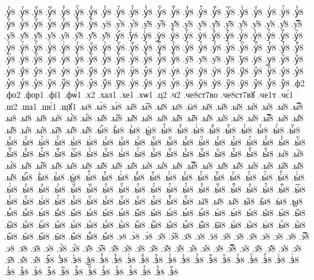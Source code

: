 {.у҅ⷰ8
.у҅ⷱ8
.у҅ⷲ8
.у҅ⷳ8
.у҅ⷴ8
.у҅ⷵ8
.у҅ⷶ8
.у҅ⷷ8
.у҅ⷸ8
.у҅ⷹ8
.у҅ⷺ8
.у҅ⷻ8
.у҅ⷼ8
.у҅ⷽ8
.у҅ⷾ8
.у҅ⷿ8
.у҅꙯8
.у҅ꙴ8
.у҅ꙵ8
.у҅ꙶ8
.у҅ꙷ8
.у҅ꙸ8
.у҅ꙹ8
.у҅ꙺ8
.у҅ꙻ8
.у҅꙼8
.у҅꙽8
.у҅ꚞ8
.у҅ꚟ8
.у҆8
.у҆̀8
.у҆́8
.у҆̂8
.у҆̅8
.у҆̆8
.у҆̇8
.у҆̈8
.у҆̋8
.у҆̏8
.у҆̑8
.у҆̓8
.у҆̔8
.у҆̾8
.у҆̿8
.у҆͘8
.у҆҃8
.у҆҄8
.у҆҅8
.у҆҆8
.у҆҇8
.у҆᷀8
.у҆᷁8
.у҆᷶8
.у᷷҆8
.у᷸҆8
.у᷹҆8
.у҆ⷠ8
.у҆ⷡ8
.у҆ⷢ8
.у҆ⷣ8
.у҆ⷤ8
.у҆ⷥ8
.у҆ⷦ8
.у҆ⷧ8
.у҆ⷨ8
.у҆ⷩ8
.у҆ⷪ8
.у҆ⷫ8
.у҆ⷬ8
.у҆ⷭ8
.у҆ⷮ8
.у҆ⷯ8
.у҆ⷰ8
.у҆ⷱ8
.у҆ⷲ8
.у҆ⷳ8
.у҆ⷴ8
.у҆ⷵ8
.у҆ⷶ8
.у҆ⷷ8
.у҆ⷸ8
.у҆ⷹ8
.у҆ⷺ8
.у҆ⷻ8
.у҆ⷼ8
.у҆ⷽ8
.у҆ⷾ8
.у҆ⷿ8
.у҆꙯8
.у҆ꙴ8
.у҆ꙵ8
.у҆ꙶ8
.у҆ꙷ8
.у҆ꙸ8
.у҆ꙹ8
.у҆ꙺ8
.у҆ꙻ8
.у҆꙼8
.у҆꙽8
.у҆ꚞ8
.у҆ꚟ8
.у҇8
.у᷀8
.у᷁8
.у᷶8
.у᷷8
.у᷸8
.у᷹8
.уⷠ8
.уⷡ8
.уⷢ8
.уⷣ8
.уⷤ8
.уⷥ8
.уⷦ8
.уⷧ8
.уⷨ8
.уⷩ8
.уⷪ8
.уⷫ8
.уⷬ8
.уⷭ8
.уⷮ8
.уⷯ8
.уⷰ8
.уⷱ8
.уⷲ8
.уⷳ8
.уⷴ8
.уⷵ8
.уⷶ8
.уⷷ8
.уⷸ8
.уⷹ8
.уⷺ8
.уⷻ8
.уⷼ8
.уⷽ8
.уⷾ8
.уⷿ8
.у꙯8
.уꙴ8
.уꙵ8
.уꙶ8
.уꙷ8
.уꙸ8
.уꙹ8
.уꙺ8
.уꙻ8
.у꙼8
.у꙽8
.уꚞ8
.уꚟ8
.ф2
.фо2
.фор1
.фї1
.фѡ́1
.х2
.хал1
.хе1
.хѡ1
.ц2
.ч2
.че8ст7во
.че8ст7вꙋ
.че1т
.чє́1
.ш2
.ша1
.шє́1
.щꙋ1
.ы8
.ы̀8
.ы́8
.ы̂8
.ы̅8
.ы̆8
.ы̇8
.ӹ8
.ы̋8
.ы̏8
.ы̑8
.ы̓8
.ы̔8
.ы̾8
.ы̿8
.ы͘8
.ы҃8
.ы҄8
.ы҅8
.ы҅̀8
.ы҅́8
.ы҅̂8
.ы҅̅8
.ы҅̆8
.ы҅̇8
.ы҅̈8
.ы҅̋8
.ы҅̏8
.ы҅̑8
.ы҅̓8
.ы҅̔8
.ы҅̾8
.ы҅̿8
.ы҅͘8
.ы҅҃8
.ы҅҄8
.ы҅҅8
.ы҅҆8
.ы҅҇8
.ы҅᷀8
.ы҅᷁8
.ы҅᷶8
.ы᷷҅8
.ы᷸҅8
.ы᷹҅8
.ы҅ⷠ8
.ы҅ⷡ8
.ы҅ⷢ8
.ы҅ⷣ8
.ы҅ⷤ8
.ы҅ⷥ8
.ы҅ⷦ8
.ы҅ⷧ8
.ы҅ⷨ8
.ы҅ⷩ8
.ы҅ⷪ8
.ы҅ⷫ8
.ы҅ⷬ8
.ы҅ⷭ8
.ы҅ⷮ8
.ы҅ⷯ8
.ы҅ⷰ8
.ы҅ⷱ8
.ы҅ⷲ8
.ы҅ⷳ8
.ы҅ⷴ8
.ы҅ⷵ8
.ы҅ⷶ8
.ы҅ⷷ8
.ы҅ⷸ8
.ы҅ⷹ8
.ы҅ⷺ8
.ы҅ⷻ8
.ы҅ⷼ8
.ы҅ⷽ8
.ы҅ⷾ8
.ы҅ⷿ8
.ы҅꙯8
.ы҅ꙴ8
.ы҅ꙵ8
.ы҅ꙶ8
.ы҅ꙷ8
.ы҅ꙸ8
.ы҅ꙹ8
.ы҅ꙺ8
.ы҅ꙻ8
.ы҅꙼8
.ы҅꙽8
.ы҅ꚞ8
.ы҅ꚟ8
.ы҆8
.ы҆̀8
.ы҆́8
.ы҆̂8
.ы҆̅8
.ы҆̆8
.ы҆̇8
.ы҆̈8
.ы҆̋8
.ы҆̏8
.ы҆̑8
.ы҆̓8
.ы҆̔8
.ы҆̾8
.ы҆̿8
.ы҆͘8
.ы҆҃8
.ы҆҄8
.ы҆҅8
.ы҆҆8
.ы҆҇8
.ы҆᷀8
.ы҆᷁8
.ы҆᷶8
.ы᷷҆8
.ы᷸҆8
.ы᷹҆8
.ы҆ⷠ8
.ы҆ⷡ8
.ы҆ⷢ8
.ы҆ⷣ8
.ы҆ⷤ8
.ы҆ⷥ8
.ы҆ⷦ8
.ы҆ⷧ8
.ы҆ⷨ8
.ы҆ⷩ8
.ы҆ⷪ8
.ы҆ⷫ8
.ы҆ⷬ8
.ы҆ⷭ8
.ы҆ⷮ8
.ы҆ⷯ8
.ы҆ⷰ8
.ы҆ⷱ8
.ы҆ⷲ8
.ы҆ⷳ8
.ы҆ⷴ8
.ы҆ⷵ8
.ы҆ⷶ8
.ы҆ⷷ8
.ы҆ⷸ8
.ы҆ⷹ8
.ы҆ⷺ8
.ы҆ⷻ8
.ы҆ⷼ8
.ы҆ⷽ8
.ы҆ⷾ8
.ы҆ⷿ8
.ы҆꙯8
.ы҆ꙴ8
.ы҆ꙵ8
.ы҆ꙶ8
.ы҆ꙷ8
.ы҆ꙸ8
.ы҆ꙹ8
.ы҆ꙺ8
.ы҆ꙻ8
.ы҆꙼8
.ы҆꙽8
.ы҆ꚞ8
.ы҆ꚟ8
.ы҇8
.ы᷀8
.ы᷁8
.ы᷶8
.ы᷷8
.ы᷸8
.ы᷹8
.ыⷠ8
.ыⷡ8
.ыⷢ8
.ыⷣ8
.ыⷤ8
.ыⷥ8
.ыⷦ8
.ыⷧ8
.ыⷨ8
.ыⷩ8
.ыⷪ8
.ыⷫ8
.ыⷬ8
.ыⷭ8
.ыⷮ8
.ыⷯ8
.ыⷰ8
.ыⷱ8
.ыⷲ8
.ыⷳ8
.ыⷴ8
.ыⷵ8
.ыⷶ8
.ыⷷ8
.ыⷸ8
.ыⷹ8
.ыⷺ8
.ыⷻ8
.ыⷼ8
.ыⷽ8
.ыⷾ8
.ыⷿ8
.ы꙯8
.ыꙴ8
.ыꙵ8
.ыꙶ8
.ыꙷ8
.ыꙸ8
.ыꙹ8
.ыꙺ8
.ыꙻ8
.ы꙼8
.ы꙽8
.ыꚞ8
.ыꚟ8
.э8
.э̀8
.э́8
.э̂8
.э̅8
.э̆8
.э̇8
.ӭ8
.э̋8
.э̏8
.э̑8
.э̓8
.э̔8
.э̾8
.э̿8
.э͘8
.э҃8
.э҄8
.э҅8
.э҅̀8
.э҅́8
.э҅̂8
.э҅̅8
.э҅̆8
.э҅̇8
.э҅̈8
.э҅̋8
.э҅̏8
.э҅̑8
.э҅̓8
.э҅̔8
.э҅̾8
.э҅̿8
.э҅͘8
.э҅҃8
.э҅҄8
.э҅҅8
.э҅҆8
.э҅҇8
.э҅᷀8
.э҅᷁8
.э҅᷶8
.э᷷҅8
.э᷸҅8
.э᷹҅8
.э҅ⷠ8
.э҅ⷡ8
.э҅ⷢ8
.э҅ⷣ8
.э҅ⷤ8
.э҅ⷥ8
.э҅ⷦ8
.э҅ⷧ8
.э҅ⷨ8
.э҅ⷩ8
.э҅ⷪ8
.э҅ⷫ8
.э҅ⷬ8
.э҅ⷭ8
.э҅ⷮ8
.э҅ⷯ8
.э҅ⷰ8
.э҅ⷱ8
.э҅ⷲ8
.э҅ⷳ8
.э҅ⷴ8
.э҅ⷵ8
.э҅ⷶ8
.э҅ⷷ8
.э҅ⷸ8
.э҅ⷹ8
.э҅ⷺ8
.э҅ⷻ8
}
